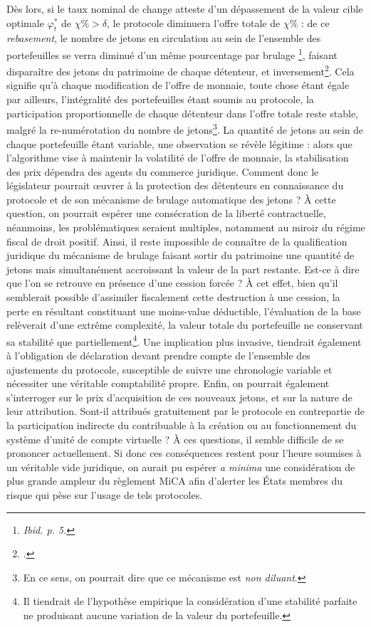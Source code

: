 {Dès lors, si le taux nominal de change atteste d'un dépassement de la valeur cible optimale $\varphi_{t}^*$ de $\chi\% > \delta$, le protocole diminuera l'offre totale de $\chi\%$ : de ce \emph{rebasement}, le nombre de jetons en circulation au sein de l'ensemble des portefeuilles se verra diminué d'un même pourcentage par \og brulage \fg{}\footnote{\emph{Ibid. p. 5.}}, faisant disparaître des jetons du patrimoine de chaque détenteur, et inversement\footnote{.}. Cela signifie qu'à chaque modification de l'offre de monnaie, toute chose étant égale par ailleurs, l'intégralité des portefeuilles étant soumis au protocole, la participation proportionnelle de chaque détenteur dans l'offre totale reste stable, malgré la re-numérotation du nombre de jetons\footnote{En ce sens, on pourrait dire que ce mécanisme est \emph{non diluant}.}. La quantité de jetons au sein de chaque portefeuille étant variable, une observation se révèle légitime : alors que l'algorithme vise à maintenir la volatilité de l'offre de monnaie, la stabilisation des prix dépendra des agents du commerce juridique. Comment donc le législateur pourrait \oe{}uvrer à la protection des détenteurs en connaissance du protocole et de son mécanisme de brulage automatique des jetons ? À cette question, on pourrait espérer une consécration de la liberté contractuelle, néanmoins, les problématiques seraient multiples, notamment au miroir du régime fiscal de droit positif. Ainsi, il reste impossible de connaître de la qualification juridique du mécanisme de brulage faisant sortir du patrimoine une quantité de jetons mais simultanément accroissant la valeur de la part restante. Est-ce à dire que l'on se retrouve en présence d'une cession forcée ? À cet effet, bien qu'il semblerait possible d'assimiler fiscalement cette destruction à une cession, la perte en résultant constituant une moins-value déductible, l'évaluation de la base relèverait d'une extrême complexité, la valeur totale du portefeuille ne conservant sa stabilité que partiellement\footnote{Il tiendrait de l'hypothèse empirique la considération d'une stabilité parfaite ne produisant aucune variation de la valeur du portefeuille.}. Une implication plus invasive, tiendrait également à l'obligation de déclaration devant prendre compte de l'ensemble des ajustements du protocole, susceptible de suivre une chronologie variable et nécessiter une véritable comptabilité propre. Enfin, on pourrait également s'interroger sur le prix d'acquisition de ces nouveaux jetons, et sur la nature de leur attribution. Sont-il attribués gratuitement par le protocole en contrepartie de la participation indirecte du contribuable à la création ou au fonctionnement du système d'unité de compte virtuelle ? À ces questions, il semble difficile de se prononcer actuellement. Si donc ces conséquences restent pour l'heure soumises à un véritable vide juridique, on aurait pu espérer \emph{a minima} une considération de plus grande ampleur du règlement MiCA afin d'alerter les États membres du risque qui pèse sur l'usage de tels protocoles.\par

}
